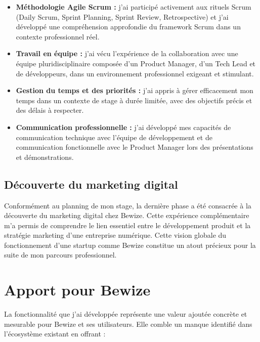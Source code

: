 \begin{itemize}
    \item \textbf{Méthodologie Agile Scrum :} j'ai participé 
    activement aux rituels Scrum (Daily Scrum, Sprint Planning, 
    Sprint Review, Retrospective) et j'ai développé une compréhension 
    approfondie du framework Scrum dans un contexte professionnel réel.
    
    \item \textbf{Travail en équipe :} j'ai vécu l'expérience 
    de la collaboration avec une équipe pluridisciplinaire composée 
    d'un Product Manager, d'un Tech Lead et de développeurs, dans 
    un environnement professionnel exigeant et stimulant.
    
    \item \textbf{Gestion du temps et des priorités :} j'ai appris 
    à gérer efficacement mon temps dans un contexte de stage à durée 
    limitée, avec des objectifs précis et des délais à respecter.
    
    \item \textbf{Communication professionnelle :} j'ai développé 
    mes capacités de communication technique avec l'équipe de 
    développement et de communication fonctionnelle avec le Product 
    Manager lors des présentations et démonstrations.
\end{itemize}

\subsection{Découverte du marketing digital}
Conformément au planning de mon stage, la dernière phase a été 
consacrée à la découverte du marketing digital chez Bewize. Cette 
expérience complémentaire m'a permis de comprendre le lien essentiel 
entre le développement produit et la stratégie marketing d'une 
entreprise numérique. Cette vision globale du fonctionnement d'une 
startup comme Bewize constitue un atout précieux pour la suite de 
mon parcours professionnel.

\section{Apport pour Bewize}
La fonctionnalité que j'ai développée représente une valeur ajoutée 
concrète et mesurable pour Bewize et ses utilisateurs. Elle comble 
un manque identifié dans l'écosystème existant en offrant :

